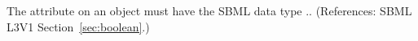 The  attribute on an \Event object
must have the SBML data type ..  (References: SBML
L3V1 Section~\ref{sec:boolean}.)
